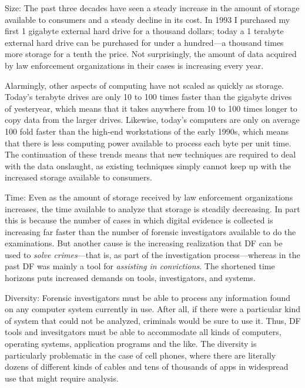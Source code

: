 \documentclass[11pt,letter]{article}
\begin{document}
\begin{compactdesc}

\item[Size:] The past three decades have seen a steady increase in the
  amount of storage available to consumers and a steady decline in its
  cost. In 1993 I purchased my first 1 gigabyte external hard drive
  for a thousand dollars; today a 1 terabyte external hard drive can
  be purchased for under a hundred---a thousand times more
  storage for a tenth the price. Not surprisingly, the amount of data
  acquired by law enforcement organizations in their cases is
  increasing every year.

  Alarmingly, other aspects of computing have not scaled as quickly as
  storage. Today's terabyte drives are only 10 to 100 times faster
  than the gigabyte drives of yesteryear, which means that it takes anywhere
  from 10 to 100 times longer to copy  data from the larger
  drives. Likewise, today's computers are only on average 100 fold
  faster than the high-end workstations of the early 1990s, which
  means that there is less computing power available to process each
  byte per unit time. The continuation of these trends means that new techniques are
  required to deal with the data onslaught, as existing techniques
  simply cannot keep up with the increased storage available to consumers.


\item[Time:] Even as the amount of storage received by law enforcement
  organizations increases, the time available to analyze that storage
  is steadily decreasing. In part this is because the number of cases
  in which digital evidence is collected is increasing far faster than
  the number of forensic investigators available to do the
  examinations. But another cause is the increasing realization that
  DF can be used to \emph{solve crimes}---that is, as
  part of the investigation process---whereas in the
  past DF was mainly a tool for \emph{assisting in convictions}. The
  shortened time horizons puts increased demands on tools,
  investigators, and systems.

\item[Diversity:] Forensic investigators must be able to process any
  information found on any computer system currently in use. After
  all, if there were a particular kind of system that could not be
  analyzed, criminals would be sure to use it. Thus, DF tools and
  invesitgators must be able to accommodate all kinds of computers,
  operating systems, application programs and the like. The diversity
  is particularly problematic in the case of cell phones, where there
  are literally dozens of different kinds of cables and tens of
  thousands of apps in widespread use that might require analysis.


\end{compactdesc}
\end{document}
